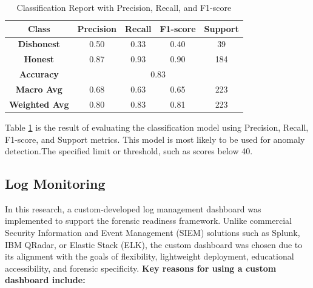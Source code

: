 \begin{table}[H]
	\centering
	\renewcommand{\arraystretch}{1.3} %
	\caption{Classification Report with Precision, Recall, and F1-score}
	\begin{tabular}{|c|c|c|c|c|}
		\hline
		\textbf{Class} & \textbf{Precision} & \textbf{Recall} & \textbf{F1-score} & \textbf{Support} \\
		\hline
		\textbf{Dishonest} & 0.50 & 0.33 & 0.40 & 39 \\
		\textbf{Honest}  & 0.87 & 0.93 & 0.90 & 184 \\
		\hline
		\textbf{Accuracy}  & \multicolumn{4}{c|}{0.83} \\
		\hline
		\textbf{Macro Avg} & 0.68 & 0.63 & 0.65 & 223 \\
		\textbf{Weighted Avg} & 0.80 & 0.83 & 0.81 & 223 \\
		\hline
	\end{tabular}
	\label{tab:classification_report}
\end{table}

Table \ref{tab:classification_report} is the result of evaluating the classification model using Precision, Recall, F1-score, and Support metrics. This model is most likely to be used for anomaly detection.The specified limit or threshold, such as scores below 40.


\subsection{Log Monitoring}
In this research, a custom-developed log management dashboard was implemented to support the forensic readiness framework. Unlike commercial Security Information and Event Management (SIEM) solutions such as Splunk, IBM QRadar, or Elastic Stack (ELK), the custom dashboard was chosen due to its alignment with the goals of flexibility, lightweight deployment, educational accessibility, and forensic specificity.
\textbf{Key reasons for using a custom dashboard include:}

